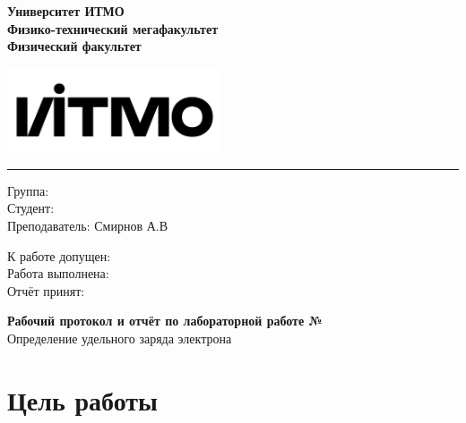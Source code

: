 \documentclass[14pt]{extarticle}
\begin{document}
    \begin{minipage}{0.5\textwidth}
        \begin{center}
            \begin{small}
                \textsf{\textbf{Университет ИТМО}} \\
                \textsf{\textbf{Физико-технический мегафакультет}} \\
                \textsf{\textbf{Физический факультет}}
            \end{small}
        \end{center}
    \end{minipage}
    \hfill
    \begin{minipage}{0.4\textwidth}
        \includegraphics[height=2.5cm]{itmo.png}
    \end{minipage}
    \hrule
    \vspace{8mm}
    \begin{minipage}{0.4\textwidth}
        Группа:  \\ %
        Студент:  \\ %
        Преподаватель: Смирнов А.В %
    \end{minipage}
    \hfill
    \begin{minipage}{0.4\textwidth}
        К работе допущен: \\
        Работа выполнена: \\
        Отчёт принят: 
    \end{minipage}
    \vspace{8mm}
    \begin{center}
        \begin{Large}
            \textbf{Рабочий протокол и отчёт по лабораторной работе №} \\ %
            Определение удельного заряда электрона %
        \end{Large}
    \end{center}
    \vspace{8mm}
 
    \section{Цель работы}
    
\end{document}
